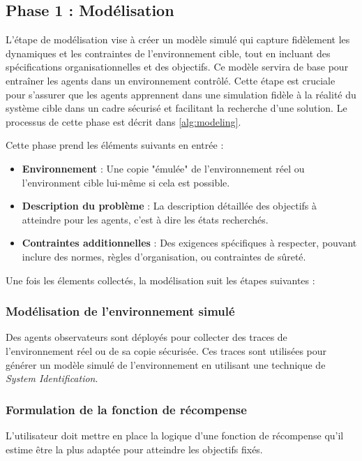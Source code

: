 \documentclass[sigconf,anonymous]{aamas}
\begin{document}

\subsection{Phase 1 : Modélisation}

L'étape de modélisation vise à créer un modèle simulé qui capture fidèlement les dynamiques et les contraintes de l'environnement cible, tout en incluant des spécifications organisationnelles et des objectifs. Ce modèle servira de base pour entraîner les agents dans un environnement contrôlé. Cette étape est cruciale pour s'assurer que les agents apprennent dans une simulation fidèle à la réalité du système cible dans un cadre sécurisé et facilitant la recherche d'une solution. Le processus de cette phase est décrit dans \autoref{alg:modeling}.

Cette phase prend les éléments suivants en entrée :
\begin{itemize}
    \item \textbf{Environnement} : Une copie "émulée" de l'environnement réel ou l'environment cible lui-même si cela est possible.
    \item \textbf{Description du problème} : La description détaillée des objectifs à atteindre pour les agents, c'est à dire les états recherchés.
    \item \textbf{Contraintes additionnelles} : Des exigences spécifiques à respecter, pouvant inclure des normes, règles d'organisation, ou contraintes de sûreté.
\end{itemize}

Une fois les élements collectés, la modélisation suit les étapes suivantes :

\subsubsection{Modélisation de l'environnement simulé}
  
Des agents observateurs sont déployés pour collecter des traces de l'environnement réel ou de sa copie sécurisée. Ces traces sont utilisées pour générer un modèle simulé de l'environnement en utilisant une technique de \textit{System Identification}.

\subsubsection{Formulation de la fonction de récompense}

L'utilisateur doit mettre en place la logique d'une fonction de récompense qu'il estime être la plus adaptée pour atteindre les objectifs fixés. 
\end{document}
